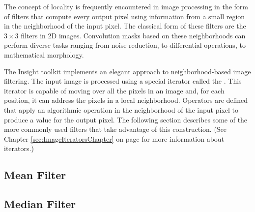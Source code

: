 The concept of locality is frequently encountered in image processing in the
form of filters that compute every output pixel using information from a small
region in the neighborhood of the input pixel.  The classical form of
these filters are the $3 \times 3$ filters in 2D images. Convolution masks
based on these neighborhoods can perform diverse tasks ranging from noise
reduction, to differential operations, to mathematical morphology.

The Insight toolkit implements an elegant approach to neighborhood-based image
filtering.  The input image is processed using a special iterator called the
. This iterator is capable of moving over all the
pixels in an image and, for each position, it can address the pixels in a local
neighborhood. Operators are defined that apply an algorithmic operation in the
neighborhood of the input pixel to produce a value for the output pixel.  The
following section describes some of the more commonly used filters that take
advantage of this construction. (See Chapter
\ref{sec:ImageIteratorsChapter} on page
\pageref{sec:ImageIteratorsChapter} for more information about iterators.)

\subsection{Mean Filter}
\label{sec:MeanFilter}

\ifitkFullVersion

\fi

\subsection{Median Filter}
\label{sec:MedianFilter}

\ifitkFullVersion

\fi




